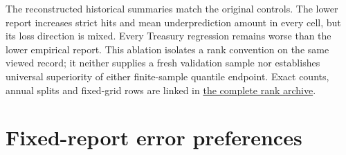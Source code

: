 \documentclass[11pt,a4paper]{article}
\begin{document}
The reconstructed historical summaries match the original controls.
The lower report increases strict hits and mean underprediction amount in every
cell, but its loss direction is mixed. Every Treasury regression remains worse
than the lower empirical report. This ablation isolates a rank convention on
the same viewed record; it neither supplies a fresh validation sample nor
establishes universal superiority of either finite-sample quantile endpoint.
Exact counts, annual splits and fixed-grid rows are linked in \href{https://github.com/ByronLi0207/financial-mathematics-paper-20261020/blob/revision-v7-final/results/revision-20261022/rank-ablation/README.md}{the complete rank archive}.\section{Fixed-report error preferences}\label{sup:preference}
\end{document}
